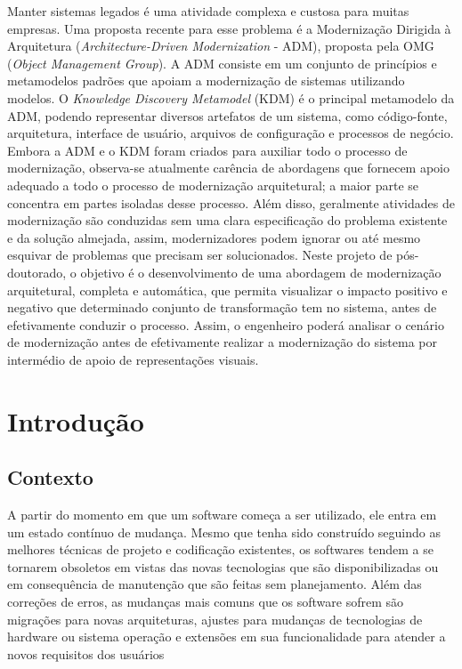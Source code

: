\documentclass[12pt]{article}
\begin{document}
 

\setlength{\voffset}{0cm}
\setlength{\hoffset}{0cm}



\begin{resumo}
Manter sistemas legados é uma atividade complexa e custosa para muitas empresas. Uma proposta recente para esse problema é a Modernização Dirigida à Arquitetura (\textit{Architecture-Driven Modernization} - ADM), proposta pela OMG (\textit{Object Management Group}). A ADM consiste em um conjunto de princípios e metamodelos padrões que apoiam a modernização de sistemas utilizando modelos. O \textit{Knowledge Discovery Metamodel} (KDM) é o principal metamodelo da ADM, podendo representar diversos artefatos de um sistema, como código-fonte, arquitetura, interface de usuário, arquivos de configuração e processos de negócio. Embora a ADM e o KDM foram criados para auxiliar todo o processo de modernização, observa-se atualmente carência de abordagens que fornecem apoio adequado a todo o processo de modernização arquitetural; a maior parte se concentra em partes isoladas desse processo. Além disso, geralmente atividades de modernização são conduzidas sem uma clara especificação do problema existente e da solução almejada, assim, modernizadores podem ignorar ou até mesmo esquivar de problemas que precisam ser solucionados. Neste projeto de pós-doutorado, o objetivo é o desenvolvimento de uma abordagem de modernização arquitetural, completa e automática, que permita visualizar o impacto positivo e negativo que determinado conjunto de transformação tem no sistema, antes de efetivamente conduzir o processo. Assim, o engenheiro poderá analisar o cenário de modernização antes de efetivamente realizar a modernização do sistema por intermédio de apoio de representações visuais.
\end{resumo}

\section{Introdução}

\subsection{Contexto}

A partir do momento em que um software começa a ser utilizado, ele entra em um estado contínuo de mudança. Mesmo que tenha sido construído seguindo as melhores técnicas de projeto e codificação existentes, os softwares tendem a se tornarem obsoletos em vistas das novas tecnologias que são disponibilizadas ou em consequência de manutenção que são feitas sem planejamento. Além das correções de erros, as mudanças mais comuns que os software sofrem são migrações para novas arquiteturas, ajustes para mudanças de tecnologias de hardware ou sistema operação e extensões em sua funcionalidade para atender a novos requisitos dos usuários~\cite{Krueger92, SoftwareReuse}
\end{document}
